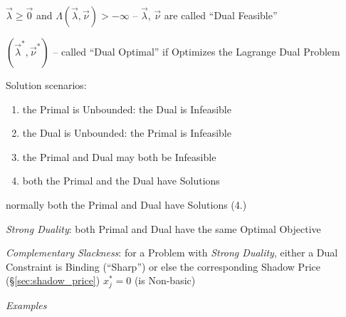 $\vec{\lambda} \geq \vec{0}$ and $\Lambda(\vec{\lambda},\vec{\nu}) > -\infty$
  -- $\vec{\lambda}$, $\vec{\nu}$ are called ``Dual Feasible''

$(\vec{\lambda}^*, \vec{\nu}^*)$ -- called ``Dual Optimal'' if Optimizes the
Lagrange Dual Problem


Solution scenarios:
\begin{enumerate}
  \item the Primal is Unbounded: the Dual is Infeasible
  \item the Dual is Unbounded: the Primal is Infeasible
  \item the Primal and Dual may both be Infeasible
  \item both the Primal and the Dual have Solutions
\end{enumerate}
normally both the Primal and Dual have Solutions (4.)


\emph{Strong Duality}: both Primal and Dual have the same Optimal Objective


\emph{Complementary Slackness}: for a Problem with \emph{Strong Duality},
either a Dual Constraint is Binding (``Sharp'') or else the corresponding
Shadow Price (\S\ref{sec:shadow_price}) $x_j^* = 0$ (is Non-basic)


\emph{Examples}

